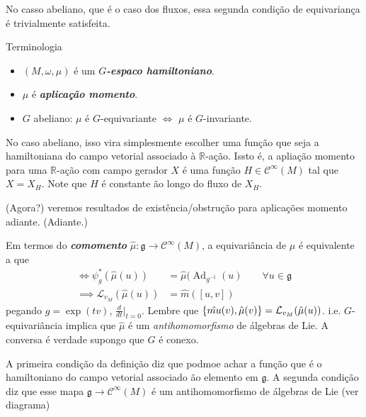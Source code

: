 No casso abeliano, que é o caso dos fluxos, essa segunda condição de equivariança é trivialmente satisfeita.

\begin{thing5}{Terminologia}\leavevmode
	\begin{itemize}
	\item $(M,\omega,\mu)$ é um  \textit{\textbf{$G$-espaco hamiltoniano}}.
	\item $\mu$ é \textit{\textbf{aplicação momento}}.
	\item $G$ abeliano: $\mu$ é $G$-equivariante $\iff$ $\mu$ é $G$-invariante.
	\end{itemize}
\end{thing5}

\begin{example}\leavevmode
No caso abeliano, isso vira simplesmente escolher uma função que seja a hamiltoniana do campo vetorial associado à $ \mathbb{R}$-ação. Issto é, a apliação momento para uma $\mathbb{R}$-ação com campo gerador $X$ é uma função $H\in\mathcal{C}^\infty(M)$ tal que $X=X_H$. Note que  $H$ é constante ão longo do fluxo de $X_H$.
	\end{example}

	(Agora?) veremos resultados de existência/obstrução para aplicações momento adiante. (Adiante.)

\begin{remark}\leavevmode
	Em termos do \textit{\textbf{comomento}}  $\hat{\mu}:\mathfrak{g}\longrightarrow \mathcal{C}^\infty(M)$, a equivariância de $\mu$ é equivalente a que
	\begin{align*}
		\iff \psi^* _g(\hat{\mu}(u))&=\hat{\mu}(\operatorname{Ad}_{g^{-1}}(u)\qquad \forall u\in\mathfrak{g}\\
		\implies \mathcal{L}_{v_M}(\hat{\mu}(u))&=\hat{m}\left( [u,v] \right) 
	\end{align*}
	pegando $g=\operatorname{exp}(tv)$, $\frac{d}{dt}\Big|_{t=0}$. Lembre que $\{\hat{\\mu}(v),\hat{\mu}(v)\} =\mathcal{L}_{v_M}(\hat{\mu}(u))$.
	i.e. $G$-equivariância implica que $\hat{\mu}$ é um \textit{antihomomorfismo} de álgebras de Lie. A conversa é verdade supongo que $G$ é conexo.
\end{remark}

\begin{remark}\leavevmode
	A primeira condição da definição diz que podmoe achar a função que é o hamiltoniano do campo vetorial associado ão elemento em $\mathfrak{g}$. A segunda condição diz que esse mapa $\mathfrak{g} \longrightarrow \mathcal{C}^\infty(M)$ é um antihomomorfismo de álgebras de Lie (ver diagrama)
\end{remark}

